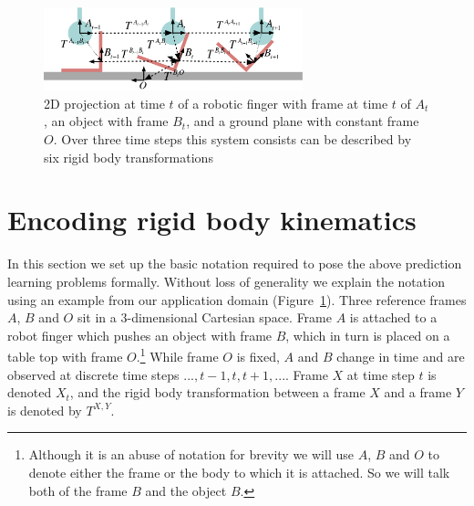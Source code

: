 \begin{figure}[t!]
\centerline{\includegraphics[width=0.67\textwidth]{sequential-frames}
}
\caption[Setup1]{2D projection at time $t$ of a robotic finger with frame at time $t$ of $A_{t}$,
an object with frame $B_{t}$, and a ground plane with constant frame
$O$. Over three time steps this system consists can be described by six rigid body transformations %
}
\label{fig:Learning.setup1}
\end{figure}

\section{Encoding rigid body kinematics}
\label{sec:Representations}

In this section we set up the basic notation required to pose the
above prediction learning problems formally. Without loss of generality we explain the notation using an example from our application domain
(Figure~\ref{fig:Learning.setup1}). Three reference frames $A$, $B$
and $O$ sit in a $3$\nobreakdash-\hspace{0pt}dimensional Cartesian
space. Frame $A$ is attached to a robot finger which pushes an object with frame $B$, which in turn is placed on a table top with frame
$O$.\footnote{Although it is an abuse of notation for brevity we will
  use $A$, $B$ and $O$ to denote either the frame or the body to which  it is attached. So we will talk both of the frame $B$ and the object $B$.} While frame $O$ is fixed, $A$ and $B$ change in time and are observed at discrete time steps $..., t-1, t, t+1, ...$.  Frame $X$ at
time step $t$ is denoted $X_t$, and the rigid body transformation
between a frame $X$ and a frame $Y$ is denoted by $T^{X, Y}$.

